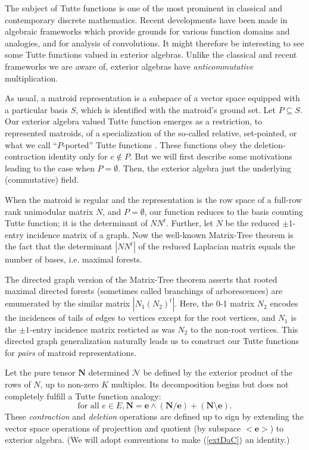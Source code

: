 \documentclass[Unicode]{cedram-alco}
\begin{document}
The subject of Tutte functions is one of the most prominent
in classical and contemporary discrete mathematics. Recent
developments have been made in algebraic frameworks which provide
grounds for various function domains and analogies,
and for analysis of convolutions.
It might therefore be interesting to see some Tutte functions valued
in exterior algebras.  Unlike the classical and recent frameworks
we are aware of, 
exterior algebras \cite{MarcusFDMuAlPt2} have \emph{anticommutative} multiplication.

As usual, a matroid representation is a subspace
of a vector space equipped with a particular basis $S$, which is 
identified with the matroid's ground set.  Let $P \subseteq S$.
Our exterior
algebra valued Tutte function emerges as a restriction, to represented matroids,
of a specialization of
the so-called relative, set-pointed, or what we call ``$P$-ported''
Tutte functions \cite{MR0419272,SetPointedLV,sdcPorted,TutteEx,RelTuttePolyDiaoHetyei}.
These functions obey the deletion-contraction
identity only for $e\not\in P$.  But we will first describe some motivations leading to
the case when $P=\emptyset$.  Then, the exterior algebra just the underlying (commutative)
field.

When the matroid is regular and
the representation is the row space of a full-row rank unimodular matrix $N$, and $P=\emptyset$,
our function reduces to the basis counting Tutte function; it is the determinant
of $N N^t$.
Further, let $N$ be the reduced $\pm 1$-entry incidence matrix of a graph.
Now the well-known Matrix-Tree theorem
is the fact that the determinant $|N N^t|$ of the
reduced Laplacian matrix equals the number of bases, i.e. maximal forests.

The directed graph version of the Matrix-Tree theorem asserts that rooted maximal directed forests
(sometimes called branchings of arborescences) are emumerated by the similar matrix
$|N_1 (N_2)^t|$.  Here, the 0-1 matrix $N_2$ encodes the incidences of tails of edges to
vertices except for the root vertices, and $N_1$ is the $\pm 1$-entry incidence matrix
resticted as was $N_2$ to the non-root vertices.
This directed graph generalization 
naturally leads us to construct our
Tutte functions for \emph{pairs} of matroid representations.    

Let the pure tensor $\mathbf{N}$
determined $\mathcal{N}$ be defined
by the exterior product 
of the rows of $N$, up to non-zero $K$ multiples.  Its 
decomposition begins but does not completely fulfill a Tutte function analogy:
\begin{equation}\label{extDaC}
  \text{for all } e \in E, \mathbf{N} =
  \mathbf{e}\wedge(\mathbf{N}/\mathbf{e}) +
  (\mathbf{N}\setminus \mathbf{e}).
\end{equation}
These \emph{contraction} and \emph{deletion} operations are defined up to sign
by extending the vector space operations of projecttion and quotient
(by subspace $<\mathbf{e}>$) to exterior algebra.  (We will adopt comventions
to make (\ref{extDaC}) an identity.)




\end{document}
